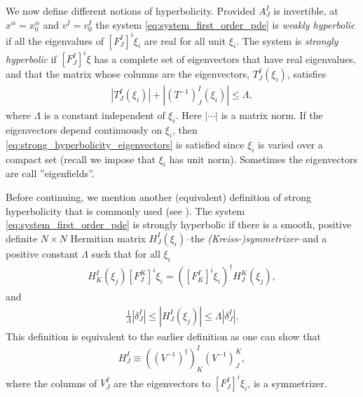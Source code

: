 \documentclass{ws-ijmpd}
\begin{document}
We now define different notions of hyperbolicity.
Provided $A^I_J$ is invertible, at $x^{\alpha}=x^{\alpha}_0$
and $v^I=v^I_0$ the system \eqref{eq:system_first_order_pde}
is \emph{weakly hyperbolic} if all the eigenvalues
of $\left[F^I_J\right]^i\xi_i$ are real for all unit $\xi_i$.
The system is \emph{strongly hyperbolic} if $\left[F^I_J\right]^i\xi$
has a complete set of eigenvectors that have real eigenvalues,
and that the matrix
whose columns are the eigenvectors, $T^I_J\left(\xi_i\right)$, satisfies
\begin{align}
\label{eq:strong_hyperbolicity_eigenvectors}
   \left| T^I_J\left(\xi_i\right)\right|
   +
   \left| \left(T^{-1}\right)^I_J\left(\xi_i\right)\right|
   \leq
   \Lambda
   ,
\end{align}
where $\Lambda$ is a constant independent of $\xi_i$.
Here $\left|\cdots\right|$ is a matrix norm.
If the eigenvectors depend continuously on $\xi_i$,
then \eqref{eq:strong_hyperbolicity_eigenvectors} is satisfied
since $\xi_i$ is varied over a compact set
(recall we impose that $\xi_i$ has unit norm).
Sometimes the eigenvectors are call 
''eigenfields''\cite{alcubierre2008introduction}.

Before continuing, we mention another (equivalent) definition of strong
hyperbolicity that is commonly used 
(see ). 
The system \eqref{eq:system_first_order_pde} is strongly hyperbolic if
there is a smooth, positive definite $N\times N$
Hermitian matrix $H^I_J(\xi_i)$--the \emph{(Kreiss-)symmetrizer}--and
a positive constant $\Lambda$ such that for all $\xi_i$
\begin{align}
   H^I_K(\xi_j) \left[F^K_J\right]^i\xi_i
   =
   \left(\left[F^I_K\right]^i\xi_i\right)^{\dagger}  H^K_J (\xi_j) 
   ,
\end{align}
and
\begin{align}
   \frac{1}{\Lambda} \left|\delta^I_J\right| 
   \leq 
   \left|H^I_J(\xi_j)\right| 
   \leq  
   \Lambda \left|\delta^I_J\right|
   .
\end{align}
This definition is equivalent to the earlier definition
as one can show that
\begin{align}
   H^I_J 
   \equiv 
   \left(\left(V^{-1}\right)^{\dagger}\right)^I_K
   \left(V^{-1}\right)^K_J, 
\end{align}
where the columns of $V^I_J$ are
the eigenvectors to $\left[F^I_J\right]^i\xi_i$, is a symmetrizer.
\end{document}
